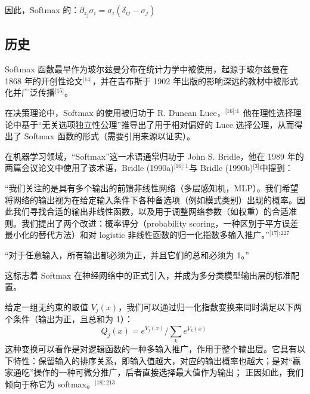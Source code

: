因此，Softmax 的：$\partial_{z_j} \sigma_i = \sigma_i \left( \delta_{ij} - \sigma_j \right)$
\subsection{历史}
Softmax 函数最早作为玻尔兹曼分布在统计力学中被使用，起源于玻尔兹曼在 1868 年的开创性论文\(^\text{[14]}\)，并在吉布斯于 1902 年出版的影响深远的教材中被形式化并广泛传播\(^\text{[15]}\)。

在决策理论中，Softmax 的使用被归功于 R. Duncan Luce，\(^\text{[16]: 1}\)  他在理性选择理论中基于“无关选项独立性公理”推导出了用于相对偏好的 Luce 选择公理，从而得出了 Softmax 函数的形式（需要引用来源以证实）。

在机器学习领域，“Softmax”这一术语通常归功于 John S. Bridle，他在 1989 年的两篇会议论文中使用了该术语，Bridle (1990a)\(^\text{[16]: 1 }\)与 Bridle (1990b)\(^\text{[3]}\)中提到：

“我们关注的是具有多个输出的前馈非线性网络（多层感知机，MLP）。我们希望将网络的输出视为在给定输入条件下各种备选项（例如模式类别）出现的概率。因此我们寻找合适的输出非线性函数，以及用于调整网络参数（如权重）的合适准则。我们提出了两个改进：概率评分（probability scoring，一种区别于平方误差最小化的替代方法）和对 logistic 非线性函数的归一化指数多输入推广。”\(^\text{[17]: 227 }\)

“对于任意输入，所有输出都必须为正，并且它们的总和必须为 1。”

这标志着 Softmax 在神经网络中的正式引入，并成为多分类模型输出层的标准配置。

给定一组无约束的取值 $V_j(x)$，我们可以通过归一化指数变换来同时满足以下两个条件（输出为正，且总和为 1）：
$$
Q_j(x) = e^{V_j(x)}/\sum_k e^{V_k(x)}~
$$
这种变换可以看作是对逻辑函数的一种多输入推广，作用于整个输出层。它具有以下特性：保留输入的排序关系，即输入值越大，对应的输出概率也越大；是对“赢家通吃”操作的一种可微分推广，后者直接选择最大值作为输出；
正因如此，我们倾向于称它为 softmax。\(^\text{[18]: 213  }\)


